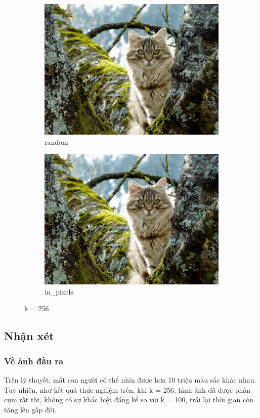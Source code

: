 \documentclass{article}
\begin{document}
\begin{figure}[ht!]
  \begin{subfigure}{.5\textwidth}
    \centering
    \includegraphics[width=.8\linewidth]{image/random_256.png}
    \caption{random}
    \label{fig:sfig9}
  \end{subfigure}%
  \begin{subfigure}{.5\textwidth}
    \centering
    \includegraphics[width=.8\linewidth]{image/in_256.png}
    \caption{in\_pixels}
    \label{fig:sfig10}
  \end{subfigure}
  \caption{k = 256}
  \label{fig:fig4}
\end{figure}

\pagebreak
\newpage
\subsection{Nhận xét}
\subsubsection{Về ảnh đầu ra}
Trên lý thuyết, mắt con người có thể nhìn được hơn 10 triệu màu sắc khác nhau. Tuy nhiên, như kết quả thực nghiệm trên, khi k = 256, hình ảnh đã được phân cụm rất tốt, không có sự khác biệt đáng kể so với k = 100, trái lại thời gian còn tăng lên gấp đôi. \par
\end{document}
